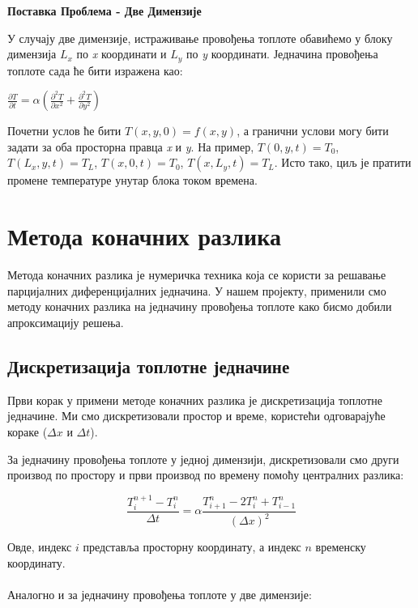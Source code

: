 \documentclass[a4paper,12pt]{article}
\begin{document}
	\begin{center}
		\textbf{Поставка Проблема - Две Димензије}
	\end{center}
	У случају две димензије, истраживање провођења топлоте обавићемо у блоку димензија \textit{${L}_{x}$} по \textit{x} координати и \textit{${L}_{y}$} по \textit{y} координати. Једначина провођења топлоте сада ће бити изражена као:\\ \begin{center}
		$ \frac{\partial T}{\partial t} = \alpha (\frac{\partial^2 T}{\partial x^2} + \frac{\partial^2 T}{\partial y^2}) $
	\end{center} Почетни услов ће бити $ T(x,y,0) = f(x,y) $, а гранични услови могу бити задати за оба просторна правца \textit{x} и \textit{y}. На пример, $ T(0,y,t) = {T}_{0} $, $ T({L}_{x},y,t) = {T}_{L}$, $ T(x,0,t) = {T}_{0} $, $ T(x,{L}_{y},t) = {T}_{L}$. Исто тако, циљ је пратити промене температуре унутар блока током времена.    
	
	\section{Метода коначних разлика}
	
	Метода коначних разлика је нумеричка техника која се користи за решавање парцијалних диференцијалних једначина. У нашем пројекту, применили смо методу коначних разлика на једначину провођења топлоте како бисмо добили апроксимацију решења.
	
	\subsection{Дискретизација топлотне једначине}
	
	Први корак у примени методе коначних разлика је дискретизација топлотне једначине. Ми смо дискретизовали простор и време, користећи одговарајуће кораке (\( \Delta x \) и \( \Delta t \)). 
	
	За једначину провођења топлоте у једној димензији, дискретизовали смо други производ по простору и први производ по времену помоћу централних разлика:
	
	\[ \frac{T_{i}^{n+1} - T_{i}^{n}}{\Delta t} = \alpha \frac{T_{i+1}^{n} - 2T_{i}^{n} + T_{i-1}^{n}}{(\Delta x)^2} \]
	
	Овде, индекс \( i \) представља просторну координату, а индекс \( n \) временску координату.
	\\\\
	Аналогно и за једначину провођења топлоте у две димензије:
	
\end{document}
